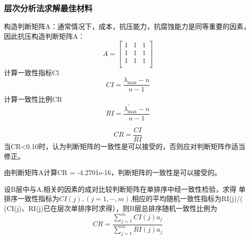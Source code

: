 \documentclass{article}
\newcommand{\upcite}[1]{\textsuperscript{\textsuperscript{\cite{#1}}}}
\begin{document}
  \subsubsection{层次分析法求解最佳材料}
  构造判断矩阵A：通常情况下，成本，抗压能力，抗腐蚀能力是同等重要的因素，因此抗压构造判断矩阵A：
  $$
  A=\left[ \begin{matrix}
  1&		1&		1\\
  1&		1&		1\\
  1&		1&		1\\
  \end{matrix} \right] 
  $$
  计算一致性指标Cl
  \begin{equation}
  C I=\frac{\lambda_{\max }-n}{n-1}
  \end{equation}
  计算一致性比例CR\upcite{数学模型}
  \begin{equation}
  R I=\frac{\lambda_{\max }^{\prime}-n}{n-1}
  \end{equation}

  \begin{equation}
  C R=\frac{C I}{R I}
  \end{equation}
  当CR<0.10时，认为判断矩阵的一致性是可以接受的，否则应对判断矩阵作适当修正。
  
  由判断矩阵A计算CR = -4.2701e-16，判断矩阵的一致性是可以接受的。
  
  设B层中与A,相关的因素的成对比较判断矩阵在单排序中经一致性检验，求得
  单排序一致性指标为$C I(j),(j=1, \cdots, m)$,相应的平均随机一致性指标为RI(j)/(
  (CI(j)、RI(j)已在层次单排序时求得），则B层总排序随机一致性比例为
  \begin{equation}
  C R=\frac{\sum_{j=1}^{m} C I(j) a_{j}}{\sum_{j=1}^{m} R I(j) a_{j}}
  \end{equation}
  
\end{document}
